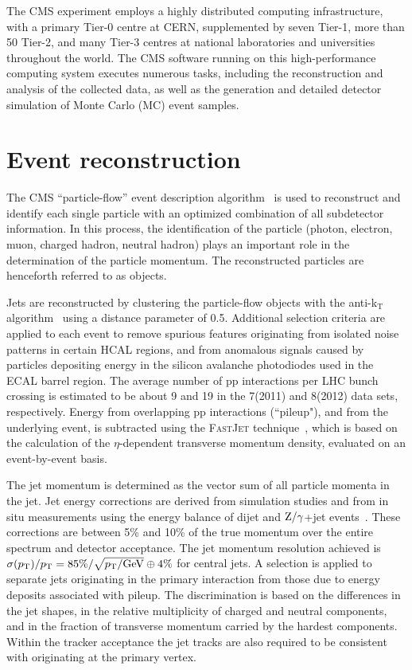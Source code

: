 \documentclass[11pt,twoside,a4paper,cmspaper,final]{cms-tdr}
\begin{document}
The CMS experiment employs a highly distributed computing infrastructure, with a
primary Tier-0 centre at CERN, supplemented by seven Tier-1, more than 50 Tier-2, and many
Tier-3 centres at national laboratories and universities throughout
the world.
The CMS software running on this high-perfor\-mance
computing system executes numerous tasks, including the reconstruction
and analysis of the collected data, as well as the generation and
detailed detector simulation of Monte Carlo (MC) event samples.

\section{Event reconstruction}\label{sec:EventDesc}

The CMS ``particle-flow'' event description algorithm~\cite{CMS-PAS-PFT-09-001,CMS-PAS-PFT-10-001}
is used to reconstruct and identify each single particle with an
optimized combination of all subdetector information.
In this process, the identification of the particle (photon,
electron, muon, charged hadron, neutral hadron) plays an important
role in the determination of the particle momentum. The reconstructed particles are henceforth
referred to as objects.

Jets are reconstructed by clustering the particle-flow objects with
the anti-k$_\mathrm{T}$ algorithm~\cite{Cacciari:2008gp} using a
distance parameter of 0.5.
Additional selection criteria are applied to each event to remove
spurious features originating from isolated noise patterns in
certain HCAL regions, and from anomalous signals caused by
particles depositing energy in the
silicon avalanche photodiodes used in the ECAL barrel region.
The average number of {pp} interactions per LHC bunch crossing
is estimated to be about 9 and 19 in the 7\TeV (2011) and
8\TeV (2012) data sets, respectively.
Energy from overlapping pp interactions (``pileup"), and from the underlying
event, is subtracted using the \textsc{FastJet}
technique~\cite{Cacciari:2007fd,Cacciari:2008gn,Cacciari:2011ma},
which is based on the calculation of the $\eta$-dependent transverse momentum
density, evaluated on an event-by-event basis.

The jet momentum is determined as the vector sum of all particle
momenta in the jet.
Jet energy corrections
are derived from simulation studies and from
in situ measurements using the energy balance of dijet and
$\mathrm{Z}/\gamma$+jet events~\cite{CMS-JME-10-011}.
These corrections are between 5\% and 10\% of the
true momentum over the entire \pt spectrum and detector acceptance.
The jet momentum resolution achieved is
$\sigma(p_{\mathrm{T}})/p_{\mathrm{T}} = 85\%/\sqrt{p_{\mathrm{T}}/\text{Ge\hspace{-.08em}V}} \oplus
4\%$ for central jets.
A selection is applied to separate jets originating in the primary
interaction from those due to energy deposits associated
with pileup. The discrimination is based on the differences in the jet
shapes, in the relative multiplicity of charged and neutral components,
and in the fraction of transverse momentum carried by
the hardest components. Within the tracker acceptance the jet tracks are
also required to be consistent with originating at the primary vertex.
\end{document}
